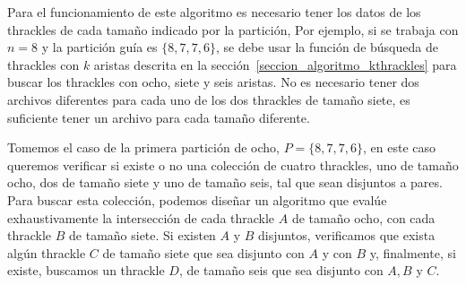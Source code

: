  \begin{algorithm}
    \LinesNumbered
    \setcounter{AlgoLine}{35}
  \end{algorithm}

  Para el funcionamiento de este algoritmo es necesario tener los datos de los thrackles de cada
  tamaño indicado por la partición, Por ejemplo, si se trabaja con $n=8$ y la partición guía es
  $\{8,7,7,6\}$, se debe usar la función de búsqueda de thrackles con $k$ aristas descrita en
  la sección~\ref{seccion_algoritmo_kthrackles} para buscar los thrackles con ocho, siete y seis
  aristas. No es necesario tener dos archivos diferentes para cada uno de los dos thrackles de
  tamaño siete, es suficiente tener un archivo para cada tamaño diferente.

  Tomemos el caso de la primera partición de ocho, $P=\{8,7,7,6\}$, en este caso queremos
  verificar si existe o no una colección de cuatro thrackles, uno de tamaño ocho, dos de
  tamaño siete y uno de tamaño seis, tal que sean disjuntos a pares. Para buscar esta colección,
  podemos diseñar un algoritmo que evalúe exhaustivamente la intersección de cada
  thrackle $A$ de tamaño ocho, con cada thrackle $B$ de tamaño siete. Si existen $A$ y $B$
  disjuntos, verificamos que exista algún thrackle $C$ de tamaño siete que sea disjunto con
  $A$ y con $B$ y, finalmente, si existe, buscamos un thrackle $D$, de tamaño seis que sea
  disjunto con $A,B$ y $C$.

